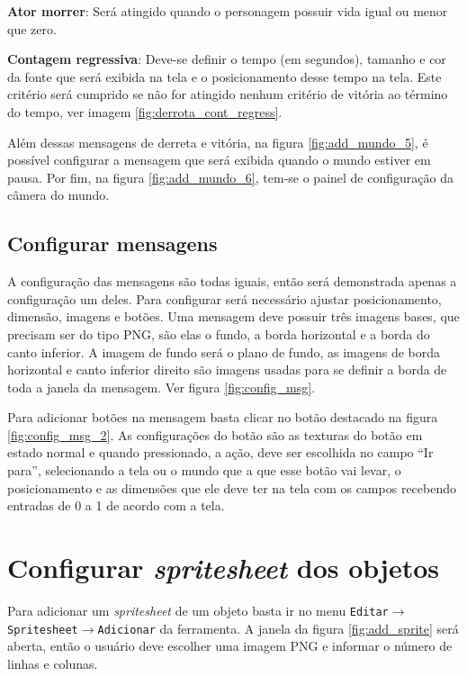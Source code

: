 \documentclass[12pt,oneside,openright,a4paper,english,brazil,sumario=tradicional]{abntex2}
\begin{document}
\begin{anexosenv}
   \begin{alineas}
   \item \textbf{Ator morrer}: Será atingido quando o personagem possuir vida igual ou menor que zero.
   \item \textbf{Contagem regressiva}: Deve-se definir o tempo (em segundos), tamanho e cor da fonte que será exibida na tela e o posicionamento desse tempo na tela. Este critério será cumprido se não for atingido nenhum critério de vitória ao término do tempo, ver imagem \ref{fig:derrota_cont_regress}.
   \end{alineas}

   Além dessas mensagens de derreta e vitória, na figura \ref{fig:add_mundo_5}, é possível configurar a mensagem que será exibida quando o mundo estiver em pausa.
   Por fim, na figura \ref{fig:add_mundo_6}, tem-se o painel de configuração da câmera do mundo.

   \subsection{Configurar mensagens}
   A configuração das mensagens são todas iguais, então será demonstrada apenas a configuração um deles. Para configurar será necessário ajustar posicionamento, dimensão, imagens e botões. Uma mensagem deve possuir três imagens bases, que precisam ser do tipo PNG, são elas o fundo, a borda horizontal e a borda do canto inferior. A imagem de fundo será o plano de fundo, as imagens de borda horizontal e canto inferior direito são imagens usadas para se definir a borda de toda a janela da mensagem. Ver figura \ref{fig:config_msg}.

   Para adicionar botões na mensagem basta clicar no botão destacado na figura \ref{fig:config_msg_2}. As configurações do botão são as texturas do botão em estado normal e quando pressionado, a ação, deve ser escolhida no campo “Ir para”, selecionando a tela ou o mundo que a que esse botão vai levar, o posicionamento e as dimensões que ele deve ter na tela com os campos recebendo entradas de 0 a 1 de acordo com a tela.

   \section{Configurar \emph{spritesheet} dos objetos}
   Para adicionar um \emph{spritesheet} de um objeto basta ir no menu \texttt{Editar$\rightarrow$Spritesheet$\rightarrow$Adicionar} da ferramenta. A janela da figura \ref{fig:add_sprite} será aberta, então o usuário deve escolher uma imagem PNG e informar o número de linhas e colunas.


\end{anexosenv}
\end{document}
